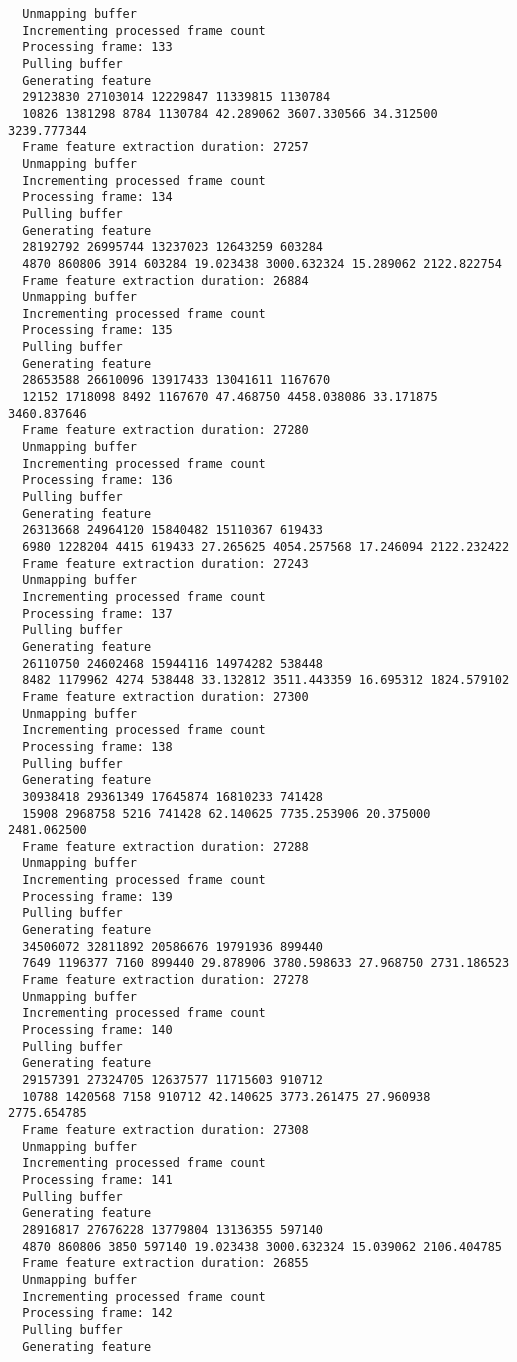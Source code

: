 \documentclass[12pt,oneside]{book}
\begin{document}
\begin{lstlisting}
  Unmapping buffer
  Incrementing processed frame count
  Processing frame: 133
  Pulling buffer
  Generating feature
  29123830 27103014 12229847 11339815 1130784
  10826 1381298 8784 1130784 42.289062 3607.330566 34.312500 3239.777344
  Frame feature extraction duration: 27257
  Unmapping buffer
  Incrementing processed frame count
  Processing frame: 134
  Pulling buffer
  Generating feature
  28192792 26995744 13237023 12643259 603284
  4870 860806 3914 603284 19.023438 3000.632324 15.289062 2122.822754
  Frame feature extraction duration: 26884
  Unmapping buffer
  Incrementing processed frame count
  Processing frame: 135
  Pulling buffer
  Generating feature
  28653588 26610096 13917433 13041611 1167670
  12152 1718098 8492 1167670 47.468750 4458.038086 33.171875 3460.837646
  Frame feature extraction duration: 27280
  Unmapping buffer
  Incrementing processed frame count
  Processing frame: 136
  Pulling buffer
  Generating feature
  26313668 24964120 15840482 15110367 619433
  6980 1228204 4415 619433 27.265625 4054.257568 17.246094 2122.232422
  Frame feature extraction duration: 27243
  Unmapping buffer
  Incrementing processed frame count
  Processing frame: 137
  Pulling buffer
  Generating feature
  26110750 24602468 15944116 14974282 538448
  8482 1179962 4274 538448 33.132812 3511.443359 16.695312 1824.579102
  Frame feature extraction duration: 27300
  Unmapping buffer
  Incrementing processed frame count
  Processing frame: 138
  Pulling buffer
  Generating feature
  30938418 29361349 17645874 16810233 741428
  15908 2968758 5216 741428 62.140625 7735.253906 20.375000 2481.062500
  Frame feature extraction duration: 27288
  Unmapping buffer
  Incrementing processed frame count
  Processing frame: 139
  Pulling buffer
  Generating feature
  34506072 32811892 20586676 19791936 899440
  7649 1196377 7160 899440 29.878906 3780.598633 27.968750 2731.186523
  Frame feature extraction duration: 27278
  Unmapping buffer
  Incrementing processed frame count
  Processing frame: 140
  Pulling buffer
  Generating feature
  29157391 27324705 12637577 11715603 910712
  10788 1420568 7158 910712 42.140625 3773.261475 27.960938 2775.654785
  Frame feature extraction duration: 27308
  Unmapping buffer
  Incrementing processed frame count
  Processing frame: 141
  Pulling buffer
  Generating feature
  28916817 27676228 13779804 13136355 597140
  4870 860806 3850 597140 19.023438 3000.632324 15.039062 2106.404785
  Frame feature extraction duration: 26855
  Unmapping buffer
  Incrementing processed frame count
  Processing frame: 142
  Pulling buffer
  Generating feature

\end{lstlisting}
\end{document}
